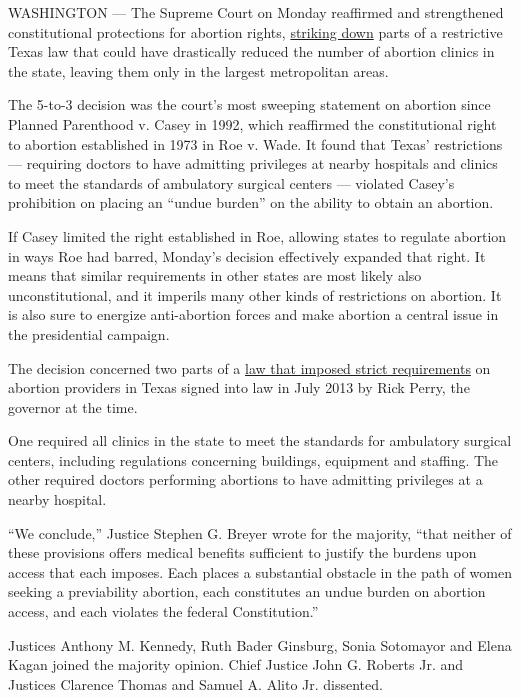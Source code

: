 WASHINGTON --- The Supreme Court on Monday reaffirmed and strengthened
constitutional protections for abortion rights,
\href{http://www.supremecourt.gov/opinions/15pdf/15-274_p8k0.pdf}{striking
down} parts of a restrictive Texas law that could have drastically
reduced the number of abortion clinics in the state, leaving them only
in the largest metropolitan areas.

The 5-to-3 decision was the court's most sweeping statement on abortion
since Planned Parenthood v. Casey in 1992, which reaffirmed the
constitutional right to abortion established in 1973 in Roe v. Wade. It
found that Texas' restrictions --- requiring doctors to have admitting
privileges at nearby hospitals and clinics to meet the standards of
ambulatory surgical centers --- violated Casey's prohibition on placing
an ``undue burden'' on the ability to obtain an abortion.

If Casey limited the right established in Roe, allowing states to
regulate abortion in ways Roe had barred, Monday's decision effectively
expanded that right. It means that similar requirements in other states
are most likely also unconstitutional, and it imperils many other kinds
of restrictions on abortion. It is also sure to energize anti-abortion
forces and make abortion a central issue in the presidential campaign.

The decision concerned two parts of a
\href{http://www.nytimes3xbfgragh.onion/2013/07/19/us/perry-signs-texas-abortion-restrictions-into-law.html}{law
that imposed strict requirements} on abortion providers in Texas signed
into law in July 2013 by Rick Perry, the governor at the time.

One required all clinics in the state to meet the standards for
ambulatory surgical centers, including regulations concerning buildings,
equipment and staffing. The other required doctors performing abortions
to have admitting privileges at a nearby hospital.

``We conclude,'' Justice Stephen G. Breyer wrote for the majority,
``that neither of these provisions offers medical benefits sufficient to
justify the burdens upon access that each imposes. Each places a
substantial obstacle in the path of women seeking a previability
abortion, each constitutes an undue burden on abortion access, and each
violates the federal Constitution.''

Justices Anthony M. Kennedy, Ruth Bader Ginsburg, Sonia Sotomayor and
Elena Kagan joined the majority opinion. Chief Justice John G. Roberts
Jr. and Justices Clarence Thomas and Samuel A. Alito Jr. dissented.

